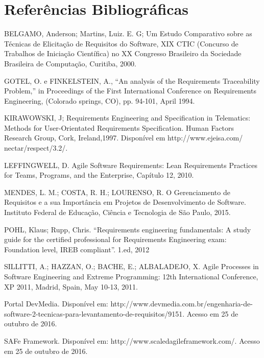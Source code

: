 \chapter[Referências Bibliográficas]{Referências Bibliográficas}

BELGAMO, Anderson; Martins, Luiz. E. G; Um Estudo Comparativo sobre as Técnicas de Elicitação de Requisitos do Software, XIX CTIC (Concurso de Trabalhos de Iniciação Científica) no XX Congresso Brasileiro da Sociedade Brasileira de Computação, Curitiba, 2000.

GOTEL, O. e FINKELSTEIN, A., “An analysis of the Requirements Traceability Problem,” in Proceedings of the First International Conference on Requirements Engineering, (Colorado springs, CO), pp. 94-101, April 1994.

KIRAWOWSKI, J; Requirements Engineering and Specification in Telematics: Methods for User-Orientated Requirements Specification. Human Factors Research Group, Cork, Ireland,1997. Disponível em http://www.ejeisa.com/ nectar/respect/3.2/. 

LEFFINGWELL, D. Agile Software Requirements: Lean Requirements Practices for Teams, Programs, and the Enterprise, Capítulo 12, 2010.

MENDES, L. M.; COSTA, R. H.; LOURENSO, R. O Gerenciamento de Requisitos e a sua Importância em Projetos de Desenvolvimento de Software. Instituto Federal de Educação, Ciência e Tecnologia de São Paulo, 2015.			

POHL, Klaus; Rupp, Chris. “Requirements engineering fundamentals: A study guide for the certified professional for Requirements Engineering exam: Foundation level, IREB compliant”. 1.ed, 2012 

SILLITTI, A.; HAZZAN, O.; BACHE, E.; ALBALADEJO, X. Agile Processes in Software Engineering and Extreme Programming: 12th International Conference, XP 2011, Madrid, Spain, May 10-13, 2011.

Portal DevMedia. Disponível em: http://www.devmedia.com.br/engenharia-de-software-2-tecnicas-para-levantamento-de-requisitos/9151. Acesso em 25 de outubro de 2016.

SAFe Framework. Disponível em: http://www.scaledagileframework.com/. Acesso em 25 de outubro de 2016.


